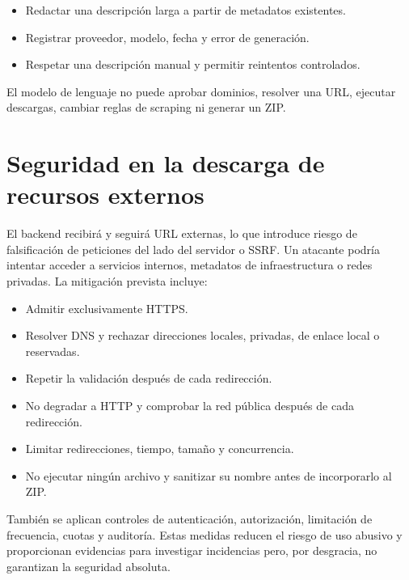 \begin{itemize}
	\item Redactar una descripción larga a partir de metadatos existentes.
	\item Registrar proveedor, modelo, fecha y error de generación.
	\item Respetar una descripción manual y permitir reintentos controlados.
\end{itemize}

El modelo de lenguaje no puede aprobar dominios, resolver una URL, ejecutar descargas, cambiar reglas de scraping ni generar un ZIP.

\section{Seguridad en la descarga de recursos externos}

El backend recibirá y seguirá URL externas, lo que introduce riesgo de falsificación de peticiones del lado del servidor o SSRF. Un atacante podría intentar acceder a servicios internos, metadatos de infraestructura o redes privadas. La mitigación prevista incluye:

\begin{itemize}
	\item Admitir exclusivamente HTTPS.
	\item Resolver DNS y rechazar direcciones locales, privadas, de enlace local o reservadas.
	\item Repetir la validación después de cada redirección.
	\item No degradar a HTTP y comprobar la red pública después de cada redirección.
	\item Limitar redirecciones, tiempo, tamaño y concurrencia.
	\item No ejecutar ningún archivo y sanitizar su nombre antes de incorporarlo al ZIP.
\end{itemize}

También se aplican controles de autenticación, autorización, limitación de frecuencia, cuotas y auditoría. Estas medidas reducen el riesgo de uso abusivo y proporcionan evidencias para investigar incidencias pero, por desgracia, no garantizan la seguridad absoluta.
